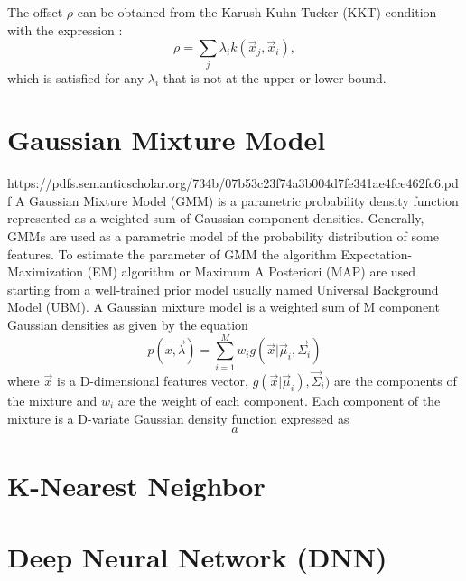 The offset $\rho$ can be obtained from the Karush-Kuhn-Tucker (KKT) condition with the expression \cite{boyd2004convex}:
\begin{equation}
\rho = \sum_j \lambda_i k(\vec{x}_j,\vec{x}_i),
\end{equation}
which is satisfied for any $\lambda_i$ that is not at the upper or lower bound.



\section{Gaussian Mixture Model}
https://pdfs.semanticscholar.org/734b/07b53c23f74a3b004d7fe341ae4fce462fc6.pdf
A Gaussian Mixture Model (GMM) is a parametric probability density function represented as a weighted sum of Gaussian component densities. Generally, GMMs are used as a parametric model of the probability distribution of some features.  To estimate the parameter of GMM the algorithm Expectation-Maximization (EM) algorithm or Maximum A Posteriori (MAP)  are used starting from a well-trained prior model usually named Universal Background Model (UBM).
A Gaussian mixture model is a weighted sum of M component Gaussian densities as given by the equation
\begin{equation}
p(\vec{x, \lambda}) = \sum_{i = 1}^{M} w_i g(\vec{x} |\vec{\mu}_i, \vec{\Sigma}_i)
\end{equation}
where $\vec{x}$ is a D-dimensional features vector, $g (\vec{x} |\vec{\mu}_i), \vec{\Sigma}_i)$ are the components of the mixture and $w_i$ are the weight of each component. Each component of the mixture is a D-variate Gaussian density function expressed as
\begin{equation}
a
\end{equation}
\section{K-Nearest Neighbor}



















\section{Deep Neural Network (DNN)}

